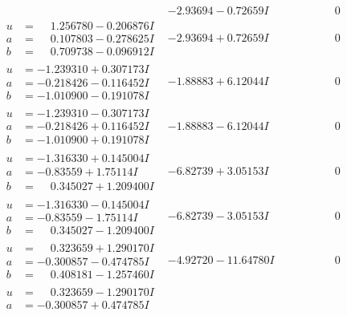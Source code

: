 \documentclass[1p]{elsarticle_modified}
\theoremstyle{definition}
\begin{document}
$$\begin{array}{c|c|c}
 & -2.93694 - 0.72659 I & \phantom{-0.000000 } 0 \\ \hline\begin{aligned}
u &= \phantom{-}1.256780 - 0.206876 I \\
a &= \phantom{-}0.107803 - 0.278625 I \\
b &= \phantom{-}0.709738 - 0.096912 I\end{aligned}
 & -2.93694 + 0.72659 I & \phantom{-0.000000 } 0 \\ \hline\begin{aligned}
u &= -1.239310 + 0.307173 I \\
a &= -0.218426 - 0.116452 I \\
b &= -1.010900 - 0.191078 I\end{aligned}
 & -1.88883 + 6.12044 I & \phantom{-0.000000 } 0 \\ \hline\begin{aligned}
u &= -1.239310 - 0.307173 I \\
a &= -0.218426 + 0.116452 I \\
b &= -1.010900 + 0.191078 I\end{aligned}
 & -1.88883 - 6.12044 I & \phantom{-0.000000 } 0 \\ \hline\begin{aligned}
u &= -1.316330 + 0.145004 I \\
a &= -0.83559 + 1.75114 I \\
b &= \phantom{-}0.345027 + 1.209400 I\end{aligned}
 & -6.82739 + 3.05153 I & \phantom{-0.000000 } 0 \\ \hline\begin{aligned}
u &= -1.316330 - 0.145004 I \\
a &= -0.83559 - 1.75114 I \\
b &= \phantom{-}0.345027 - 1.209400 I\end{aligned}
 & -6.82739 - 3.05153 I & \phantom{-0.000000 } 0 \\ \hline\begin{aligned}
u &= \phantom{-}0.323659 + 1.290170 I \\
a &= -0.300857 - 0.474785 I \\
b &= \phantom{-}0.408181 - 1.257460 I\end{aligned}
 & -4.92720 - 11.64780 I & \phantom{-0.000000 } 0 \\ \hline\begin{aligned}
u &= \phantom{-}0.323659 - 1.290170 I \\
a &= -0.300857 + 0.474785 I \\

\end{aligned}
\end{array}$$
\end{document}
